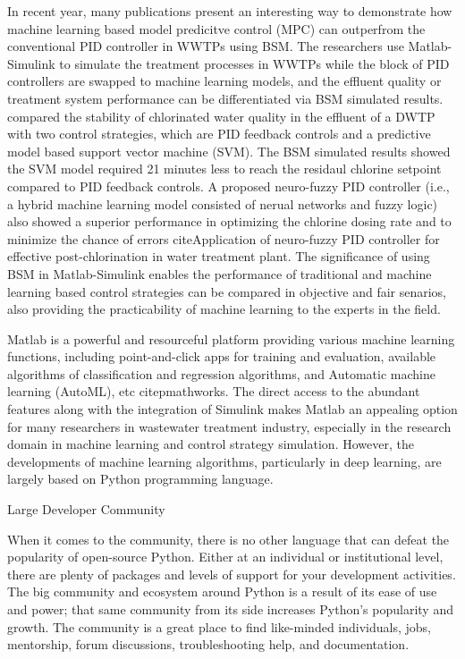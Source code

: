 In recent year, many publications present an interesting way to demonstrate how machine learning based model predicitve control (MPC) can outperfrom the conventional PID controller in WWTPs using BSM. The researchers use Matlab-Simulink to simulate the treatment processes in WWTPs while the block of PID controllers are swapped to machine learning models, and the effluent quality or treatment system performance can be differentiated via BSM simulated results. \citet{wangModelPredictiveControl2020} compared the stability of chlorinated water quality in the effluent of a DWTP with two control strategies, which are PID feedback controls and a predictive model based support vector machine (SVM). The BSM simulated results showed the SVM model required 21 minutes less to reach the residaul chlorine setpoint compared to PID feedback controls. A proposed neuro-fuzzy PID controller (i.e., a hybrid machine learning model consisted of nerual networks and fuzzy logic) also showed a superior performance in optimizing the chlorine dosing rate and to minimize the chance of errors citeApplication of neuro-fuzzy PID controller for effective post-chlorination in water treatment plant. The significance of using BSM in Matlab-Simulink enables the performance of traditional and machine learning based control strategies can be compared in objective and fair senarios, also providing the practicability of machine learning to the experts in the field. 

Matlab is a powerful and resourceful platform providing various machine learning functions, including point-and-click apps for training and evaluation, available algorithms of classification and regression algorithms, and Automatic machine learning (AutoML), etc citep{mathworks}. The direct access to the abundant features along with the integration of Simulink makes Matlab an appealing option for many researchers in wastewater treatment industry, especially in the research domain in machine learning and control strategy simulation. However, the developments of machine learning algorithms, particularly in deep learning, are largely based on Python programming language. 



Large Developer Community

When it comes to the community, there is no other language that can defeat the popularity of open-source Python. Either at an individual or institutional level, there are plenty of packages and levels of support for your development activities. The big community and ecosystem around Python is a result of its ease of use and power; that same community from its side increases Python’s popularity and growth. The community is a great place to find like-minded individuals, jobs, mentorship, forum discussions, troubleshooting help, and documentation.

